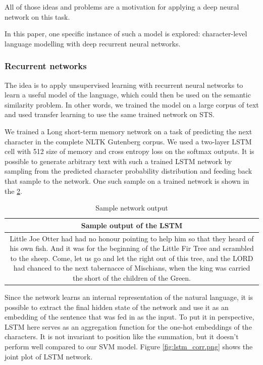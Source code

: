 \documentclass[10pt, a4paper]{article}
\begin{document}
\begin{table}[h!]
All of those ideas and problems are a motivation for applying a deep neural network on this task.

In this paper, one specific instance of such a model is explored: character-level language modelling with deep recurrent neural networks.

\subsubsection{Recurrent networks}

The idea is to apply unsupervised learning with recurrent neural networks to learn a useful model of the language, which could then be used on the semantic similarity problem.
In other words, we trained the model on a large corpus of text and used transfer learning to use the same trained network on STS.

We trained a Long short-term memory network \citep{LSTM} on a task of predicting the next character in the complete NLTK Gutenberg corpus. 
We used a two-layer LSTM cell with 512 size of memory and cross entropy loss on the softmax outputs.
It is possible to generate arbitrary text with such a trained LSTM network by sampling from the predicted character probability distribution and feeding back that sample to the network. One such sample on a trained network is shown in the \ref{tab:sample_output}.

\begin{table}
\caption{Sample network output}
\label{tab:sample_output}
\begin{center}
\begin{tabular}{c}
\toprule
Sample output of the LSTM \\
\midrule
\multicolumn{1}{m{6.5cm}}{Little Joe Otter had had no honour pointing to help him so that they
heard of his own fish.  And it was for the beginning of the Little Fir Tree and
scrambled to the sheep. 
Come, let us go and let the right out of this tree, and the LORD had chanced
to the next tabernacce of Mischians, when the king was carried the short of the children of the Green.}
\bottomrule
\end{tabular}
\end{center}
\end{table}

Since the network learns an internal representation of the natural language, it is possible to extract the final hidden state of the network and use it as an embedding of the sentence that was fed in as the input.
To put it in perspective, LSTM here serves as an aggregation function for the one-hot embeddings of the characters.
It is not invariant to position like the summation, but it doesn't perform well compared to our SVM model. 
Figure \ref{fig:lstm_corr.png} shows the joint plot of LSTM network.


\end{table}
\end{document}
